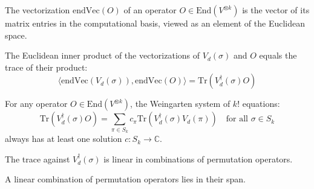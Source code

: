 \begin{definition}\label{def:endVec}
  \leanok
  The vectorization $\text{endVec}(O)$ of an operator $O \in \text{End}(V^{\otimes k})$ is the vector of its matrix entries in the computational basis, viewed as an element of the Euclidean space.
\end{definition}

\begin{theorem}\label{thm:inner_endVec_perm_eq_trace}
  \leanok
  The Euclidean inner product of the vectorizations of $V_d(\sigma)$ and $O$ equals the trace of their product:
  \begin{equation}
    \langle \text{endVec}(V_d(\sigma)), \text{endVec}(O) \rangle = \text{Tr}(V_d^\dagger(\sigma) O)
  \end{equation}
\end{theorem}

\begin{theorem}\label{thm:weingarten_linear_system_solvable}
  \leanok
  For any operator $O \in \text{End}(V^{\otimes k})$, the Weingarten system of $k!$ equations:
  \begin{equation}
    \text{Tr}(V_d^\dagger(\sigma) O) = \sum_{\pi \in S_k} c_\pi \text{Tr}(V_d^\dagger(\sigma) V_d(\pi)) \quad \text{for all } \sigma \in S_k
  \end{equation}
  always has at least one solution $c: S_k \to \mathbb{C}$.
\end{theorem}

\begin{lemma}\label{lem:trace_permDual_comp_sum}
  \leanok
  The trace against $V_d^\dagger(\sigma)$ is linear in combinations of permutation operators.
\end{lemma}

\begin{lemma}\label{lem:sum_smul_permOp_mem_span}
  \leanok
  A linear combination of permutation operators lies in their span.
\end{lemma}

